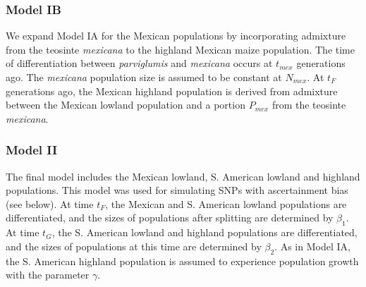 
\subsubsection{Model IB}
We expand Model IA for the Mexican populations by incorporating admixture from the teosinte \emph{mexicana} to the highland Mexican maize population.  
The time of differentiation between \emph{parviglumis} and \emph{mexicana} occurs at $t_{mex}$ generations ago.  
The \emph{mexicana} population size is assumed to be constant at $N_{mex}$.  
At $t_F$ generations ago, the Mexican highland population is derived from admixture between the Mexican lowland population and a portion $P_{mex}$ from the teosinte \emph{mexicana}.\\  

\subsubsection{Model II}
The final model includes the Mexican lowland, S. American lowland and highland populations.  
This model was used for simulating SNPs with ascertainment bias (see below).  
At time $t_F$, the Mexican and S. American lowland populations are differentiated, and the sizes of populations after splitting are determined by $\beta_1$.  
At time $t_G$, the S. American lowland and highland populations are differentiated, and the sizes of populations at this time are determined by $\beta_2$.  
As in Model IA, the S. American highland population is assumed to experience population growth with the parameter $\gamma$.\\

